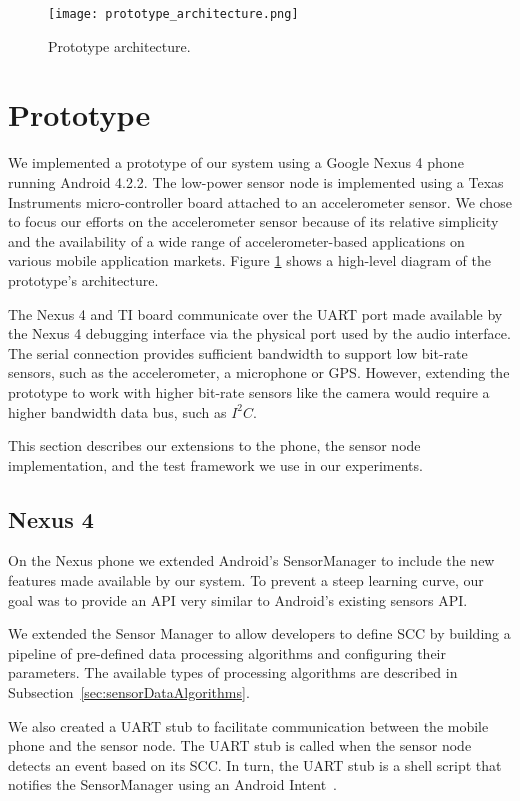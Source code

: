 
\begin{figure}[t]
	\texttt{[image: prototype\_architecture.png]}
	\caption{Prototype architecture.}
    \label{fig:prototypeArchitecture}
\end{figure}

\section{Prototype}
\label{sec:prototype}

We implemented a prototype of our system using a Google Nexus 4 phone
running Android 4.2.2.  The low-power sensor node is implemented using
a Texas Instruments micro-controller board attached to an
accelerometer sensor.  We chose to focus our efforts on the
accelerometer sensor because of its relative simplicity and the
availability of a wide range of accelerometer-based applications on
various mobile application markets.  Figure
\ref{fig:prototypeArchitecture} shows a high-level diagram of the
prototype's architecture.

The Nexus 4 and TI board communicate over the UART port made available
by the Nexus 4 debugging interface via the physical port used by the
audio interface.  The serial connection provides sufficient bandwidth
to support low bit-rate sensors, such as the accelerometer, a
microphone or GPS.  However, extending the prototype to work with
higher bit-rate sensors like the camera would require a higher
bandwidth data bus, such as $I^2C$.

This section describes our extensions to the phone, the
sensor node implementation, and the test
framework we use in our experiments.

\subsection{Nexus 4}
\label{subsec:nexus}

On the Nexus phone we extended Android's SensorManager to include the
new features made available by our system. To prevent a steep learning
curve, our goal was to provide an API very similar to Android's
existing sensors API.  

We extended the Sensor Manager to allow developers to define SCC by building
a pipeline of pre-defined data processing algorithms and configuring their
parameters. The available types of processing algorithms are
described in Subsection~\ref{sec:sensorDataAlgorithms}.

We also created a UART stub to facilitate communication between the
mobile phone and the sensor node. The UART stub is called when
the sensor node detects an event based on its SCC.
In turn, the UART stub is a shell script that notifies the
SensorManager using an Android Intent~\cite{androidintents}.

